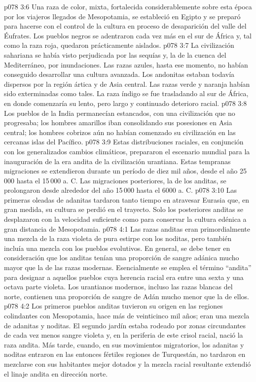 \vs p078 3:6 Una raza de color, mixta, fortalecida considerablemente sobre esta época por los viajeros llegados de Mesopotamia, se estableció en Egipto y se preparó para hacerse con el control de la cultura en proceso de desaparición del valle del Éufrates. Los pueblos negros se adentraron cada vez más en el sur de África y, tal como la raza roja, quedaron prácticamente aislados.
\vs p078 3:7 La civilización sahariana se había visto perjudicada por las sequías y, la de la cuenca del Mediterráneo, por inundaciones. Las razas azules, hasta ese momento, no habían conseguido desarrollar una cultura avanzada. Los andonitas estaban todavía dispersos por la región ártica y de Asia central. Las razas verde y naranja habían sido exterminadas como tales. La raza índigo se fue trasladando al sur de África, en donde comenzaría su lento, pero largo y continuado deterioro racial.
\vs p078 3:8 Los pueblos de la India permanecían estancados, con una civilización que no progresaba; los hombres amarillos iban consolidando sus posesiones en Asia central; los hombres cobrizos aún no habían comenzado su civilización en las cercanas islas del Pacífico.
\vs p078 3:9 \pc Estas distribuciones raciales, en conjunción con los generalizados cambios climáticos, prepararon el escenario mundial para la inauguración de la era andita de la civilización urantiana. Estas tempranas migraciones se extendieron durante un período de diez mil años, desde el año 25\,000 hasta el 15\,000 a. C. Las migraciones posteriores, la de los anditas, se prolongaron desde alrededor del año 15\,000 hasta el 6000 a. C.
\vs p078 3:10 Las primeras oleadas de adanitas tardaron tanto tiempo en atravesar Eurasia que, en gran medida, su cultura se perdió en el trayecto. Solo los posteriores anditas se desplazaron con la velocidad suficiente como para conservar la cultura edénica a gran distancia de Mesopotamia.
\vs p078 4:1 Las razas anditas eran primordialmente una mezcla de la raza violeta de pura estirpe con los noditas, pero también incluía una mezcla con los pueblos evolutivos. En general, se debe tener en consideración que los anditas tenían una proporción de sangre adánica mucho mayor que la de las razas modernas. Esencialmente se emplea el término “andita” para designar a aquellos pueblos cuya herencia racial era entre una sexta y una octava parte violeta. Los urantianos modernos, incluso las razas blancas del norte, contienen una proporción de sangre de Adán mucho menor que la de ellos.
\vs p078 4:2 Los primeros pueblos anditas tuvieron su origen en las regiones colindantes con Mesopotamia, hace más de veinticinco mil años; eran una mezcla de adanitas y noditas. El segundo jardín estaba rodeado por zonas circundantes de cada vez menos sangre violeta y, en la periferia de este crisol racial, nació la raza andita. Más tarde, cuando, en sus movimientos migratorios, los adanitas y noditas entraron en las entonces fértiles regiones de Turquestán, no tardaron en mezclarse con sus habitantes mejor dotados y la mezcla racial resultante extendió el linaje andita en dirección norte.
